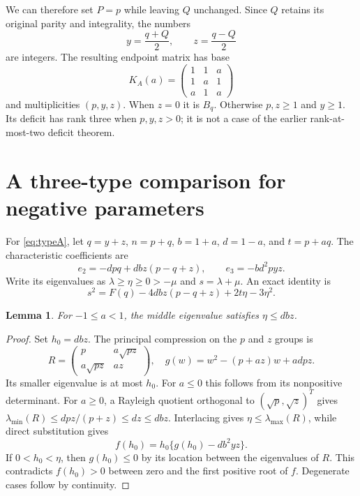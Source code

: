 \documentclass[11pt]{article}
\newtheorem{lemma}[theorem]{Lemma}
\begin{document}
We can therefore set $P=p$ while leaving $Q$ unchanged. Since $Q$ retains its
original parity and integrality, the numbers
\[
 y=\frac{q+Q}{2},\qquad z=\frac{q-Q}{2}
\]
are integers. The resulting endpoint matrix has base
\begin{equation}\label{eq:typeA}
 K_A(a)=\begin{pmatrix}1&1&a\\1&a&1\\a&1&a\end{pmatrix}
\end{equation}
and multiplicities $(p,y,z)$. When $z=0$ it is $B_q$. Otherwise $p,z\ge1$
and $y\ge1$. Its deficit has rank three when $p,y,z>0$; it is not a case of
the earlier rank-at-most-two deficit theorem.

\section{A three-type comparison for negative parameters}
For \eqref{eq:typeA}, let $q=y+z$, $n=p+q$, $b=1+a$, $d=1-a$, and $t=p+aq$.
The characteristic coefficients are
\[
 e_2=-dpq+dbz(p-q+z),\qquad e_3=-bd^2pyz.
\]
Write its eigenvalues as $\lambda\ge\eta\ge0>-\mu$ and $s=\lambda+\mu$.
An exact identity is
\begin{equation}\label{eq:etaidentity}
 s^2=F(q)-4dbz(p-q+z)+2t\eta-3\eta^2.
\end{equation}

\begin{lemma}\label{lem:eta}
For $-1\le a<1$, the middle eigenvalue satisfies $\eta\le dbz$.
\end{lemma}
\begin{proof}
Set $h_0=dbz$. The principal compression on the $p$ and $z$ groups is
\[
 R=\begin{pmatrix}p&a\sqrt{pz}\\a\sqrt{pz}&az\end{pmatrix},\quad
 g(w)=w^2-(p+az)w+adpz.
\]
Its smaller eigenvalue is at most $h_0$. For $a\le0$ this follows from its
nonpositive determinant. For $a\ge0$, a Rayleigh quotient orthogonal to
$(\sqrt p,\sqrt z)^T$ gives
$\lambda_{\min}(R)\le dpz/(p+z)\le dz\le dbz$.
Interlacing gives $\eta\le\lambda_{\max}(R)$, while direct substitution gives
\[
 f(h_0)=h_0\{g(h_0)-db^2yz\}.
\]
If $0<h_0<\eta$, then $g(h_0)\le0$ by its location between the eigenvalues
of $R$. This contradicts $f(h_0)>0$ between zero and the first positive root
of $f$. Degenerate cases follow by continuity.
\end{proof}
\end{document}
